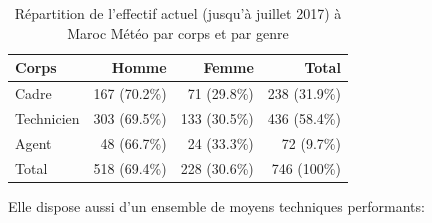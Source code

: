 \begin{table}[!h]
\centering
\begin{tabular}{lrrr}
\hline
Corps & Homme & Femme & Total \\
\hline
Cadre & 167 (70.2\%) & 71 (29.8\%) & 238 (31.9\%) \\
Technicien & 303 (69.5\%) & 133 (30.5\%) & 436 (58.4\%) \\
Agent & 48 (66.7\%) & 24 (33.3\%) & 72 (9.7\%) \\
\hline
Total & 518 (69.4\%) & 228 (30.6\%) & 746 (100\%) \\
\hline
\end{tabular}
\caption{Répartition de l'effectif actuel (jusqu'à juillet 2017) à Maroc Météo par corps et par genre}
\label{tab:effectifDMN}
\end{table}
Elle dispose aussi d'un ensemble de moyens techniques performants:

